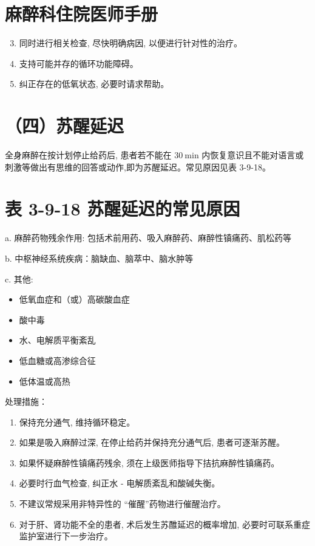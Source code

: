 \documentclass[10pt]{article}
\begin{document}
\section*{麻醉科住院医师手册}
\begin{enumerate}
  \setcounter{enumi}{2}
  \item 同时进行相关检查, 尽快明确病因, 以便进行针对性的治疗。

  \item 支持可能并存的循环功能障碍。

  \item 纠正存在的低氧状态, 必要时请求帮助。

\end{enumerate}

\section*{（四）苏醒延迟}
全身麻醉在按计划停止给药后, 患者若不能在 $30 \mathrm{~min}$ 内恢复意识且不能对语言或刺激等做出有思维的回答或动作,即为苏醒延迟。常见原因见表 3-9-18。

\section*{表 3-9-18 苏醒延迟的常见原因}
a. 麻醉药物残余作用: 包括术前用药、吸入麻醉药、麻醉性镇痛药、肌松药等

b. 中枢神经系统疾病：脑缺血、脑萃中、脑水肿等

c. 其他:

\begin{itemize}
  \item 低氧血症和（或）高碳酸血症
  \item 酸中毒
  \item 水、电解质平衡紊乱
  \item 低血糖或高渗综合征
  \item 低体温或高热
\end{itemize}

处理措施：

\begin{enumerate}
  \item 保持充分通气, 维持循环稳定。

  \item 如果是吸入麻醉过深, 在停止给药并保持充分通气后, 患者可逐渐苏醒。

  \item 如果怀疑麻醉性镇痛药残余, 须在上级医师指导下拮抗麻醉性镇痛药。

  \item 必要时行血气检查, 纠正水 - 电解质紊乱和酸碱失衡。

  \item 不建议常规采用非特异性的 “催醒”药物进行催醒治疗。

  \item 对于肝、肾功能不全的患者, 术后发生苏醀延迟的概率增加, 必要时可联系重症监护室进行下一步治疗。

\end{enumerate}
\end{document}
